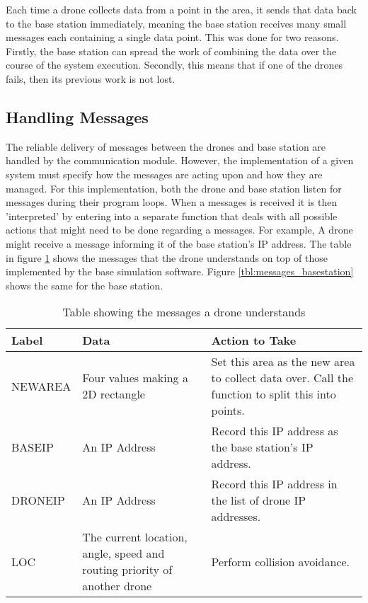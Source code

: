 Each time a drone collects data from a point in the area, it sends that data back to the base station immediately, meaning the base station receives many small messages each containing a single data point. This was done for two reasons. Firstly, the base station can spread the work of combining the data over the course of the system execution. Secondly, this means that if one of the drones fails, then its previous work is not lost.

\subsection{Handling Messages}

The reliable delivery of messages between the drones and base station are handled by the communication module. However, the implementation of a given system must specify how the messages are acting upon and how they are managed. For this implementation, both the drone and base station listen for messages during their program loops. When a messages is received it is then 'interpreted' by entering into a separate function that deals with all possible actions that might need to be done regarding a messages. For example, A drone might receive a message informing it of the base station's IP address. The table in figure \ref{tbl:messages_drone} shows the messages that the drone understands on top of those implemented by the base simulation software. Figure \ref{tbl:messages_basestation} shows the same for the base station.

\begin{table}[]
\centering
\begin{tabular}{|p{2cm}|p{4cm}|p{7.5cm}|}
\hline
Label & Data & Action to Take \\ \hline
NEWAREA	& Four values making a 2D rectangle	& Set this area as the new area to collect data over. Call the function to split this into points. \\ \hline
BASEIP & An IP Address & Record this IP address as the base station's IP address. \\ \hline
DRONEIP	& An IP Address	& Record this IP address in the list of drone IP addresses. \\ \hline
LOC	& The current location, angle, speed and routing priority of another drone & Perform collision avoidance. \\ \hline
\end{tabular}
\caption{Table showing the messages a drone understands}
\label{tbl:messages_drone}
\end{table}

